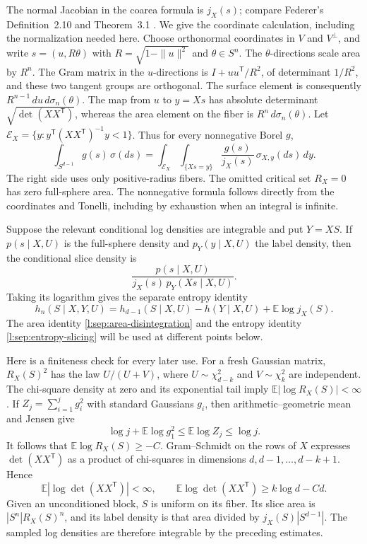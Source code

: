 The normal Jacobian in the coarea formula is \(j_X(s)\); compare
Federer's Definition~2.10 and Theorem~3.1
\cite[pp.~423 and 426--427]{Federer1959}.  We give the coordinate
calculation, including the normalization needed here.  Choose
orthonormal coordinates in \(V\) and \(V^\perp\), and write
\(s=(u,R\theta)\) with \(R=\sqrt{1-\|u\|^2}\) and
\(\theta\in S^n\).  The \(\theta\)-directions scale area by \(R^n\).
The Gram matrix in the \(u\)-directions is
\(I+uu^{\mathsf T}/R^2\), of determinant \(1/R^2\), and these two
tangent groups are orthogonal.  The surface element is consequently
\(R^{n-1}\,du\,d\sigma_n(\theta)\).  The map from \(u\) to \(y=Xs\)
has absolute determinant \(\sqrt{\det(XX^{\mathsf T})}\), whereas
the area element on the fiber is \(R^n\,d\sigma_n(\theta)\).
Let \(\mathcal E_X=\{y:y^{\mathsf T}(XX^{\mathsf T})^{-1}y<1\}\).
Thus for every nonnegative Borel \(g\),
\begin{equation}
 \int_{S^{d-1}}g(s)\,\sigma(ds)
 =\int_{\mathcal E_X}\int_{\{Xs=y\}}
       \frac{g(s)}{j_X(s)}\,\sigma_{X,y}(ds)\,dy.
 \label{l:sep:area-disintegration}
\end{equation}
The right side uses only positive-radius fibers.  The omitted
critical set \(R_X=0\) has zero full-sphere
area.  The nonnegative formula follows directly from the coordinates
and Tonelli, including by exhaustion when an integral is infinite.

Suppose the relevant conditional log densities are integrable and
put \(Y=XS\).  If \(p(s\mid X,U)\) is the full-sphere density and
\(p_Y(y\mid X,U)\) the label density, then the conditional slice
density is
\[
 \frac{p(s\mid X,U)}{j_X(s)\,p_Y(Xs\mid X,U)}.
\]
Taking its logarithm gives the separate entropy identity
\begin{equation}
 h_n(S\mid X,Y,U)
 =h_{d-1}(S\mid X,U)-h(Y\mid X,U)+\mathbb E\log j_X(S).
 \label{l:sep:entropy-slicing}
\end{equation}
The area identity \eqref{l:sep:area-disintegration} and the entropy
identity \eqref{l:sep:entropy-slicing} will be used at different
points below.

Here is a finiteness check for every later use.  For a fresh Gaussian
matrix, \(R_X(S)^2\) has the law \(U/(U+V)\), where
\(U\sim\chi^2_{d-k}\) and \(V\sim\chi^2_k\) are independent.
The chi-square density at zero and its exponential tail imply
\(\mathbb E|\log R_X(S)|<\infty\).  If
\(Z_j=\sum_{i=1}^j g_i^2\) with standard Gaussians \(g_i\), then
arithmetic--geometric mean and Jensen give
\[
 \log j+\mathbb E\log g_1^2
 \le\mathbb E\log Z_j\le\log j.
\]
It follows that \(\mathbb E\log R_X(S)\ge-C\).  Gram--Schmidt on
the rows of \(X\) expresses \(\det(XX^{\mathsf T})\) as a product
of chi-squares in dimensions \(d,d-1,\ldots,d-k+1\).  Hence
\[
 \mathbb E|\log\det(XX^{\mathsf T})|<\infty,\qquad
 \mathbb E\log\det(XX^{\mathsf T})\ge k\log d-Cd.
\]
Given an unconditioned block, \(S\) is uniform on its fiber.  Its
slice area is \(|S^n|R_X(S)^n\), and its label density is that area
divided by \(j_X(S)|S^{d-1}|\).  The sampled log densities are
therefore integrable by the preceding estimates.


